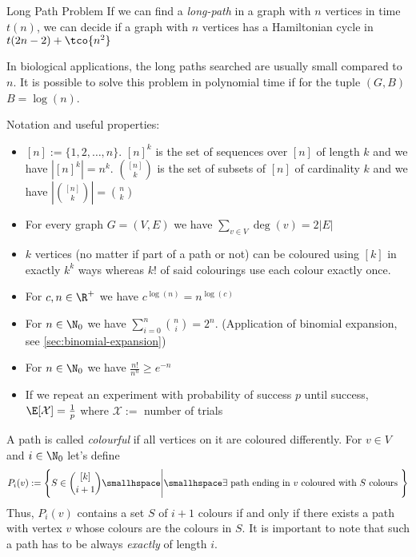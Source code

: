 \begin{theorem}[]{Long Path Problem}
    If we can find a \textit{long-path} in a graph with $n$ vertices in time $t(n)$, we can decide if a graph with $n$ vertices has a Hamiltonian cycle in $t(2n - 2) + \tco{n^2}$
\end{theorem}



In biological applications, the long paths searched are usually small compared to $n$. It is possible to solve this problem in polynomial time if for the tuple $(G, B)$ $B = \log(n)$.

Notation and useful properties:
\begin{itemize}
    \item $[n] := \{1, 2, \ldots, n\}$. $[n]^k$ is the set of sequences over $[n]$ of length $k$ and we have $\left| [n]^k \right| = n^k$. ${[n] \choose k}$ is the set of subsets of $[n]$ of cardinality $k$ and we have $\left| {[n] \choose k} \right| = {n \choose k}$
    \item For every graph $G = (V, E)$ we have $\sum_{v \in V} \deg(v) = 2|E|$
    \item $k$ vertices (no matter if part of a path or not) can be coloured using $[k]$ in exactly $k^k$ ways whereas $k!$ of said colourings use each colour exactly once.
    \item For $c, n \in \R^+$ we have $c^{\log(n)} = n^{\log(c)}$
    \item For $n \in \N_0$ we have $\sum_{i = 0}^{n} {n \choose i} = 2^n$. (Application of binomial expansion, see \ref{sec:binomial-expansion})
    \item For $n \in \N_0$ we have $\frac{n!}{n^n} \geq e^{-n}$
    \item If we repeat an experiment with probability of success $p$ until success, $\E[\mathcal{X}] = \frac{1}{p}$ where $\mathcal{X} :=$ number of trials
\end{itemize}


\newpage
{}

A path is called \textit{colourful} if all vertices on it are coloured differently.
For $v \in V$ and $i \in \N_0$ let's define
\begin{align*}
    P_i(v) := \left\{ S \in {[k] \choose i + 1} \smallhspace \Bigg| \smallhspace \exists \text{ path ending in $v$ coloured with $S$ colours } \right\}
\end{align*}
Thus, $P_i(v)$ contains a set $S$ of $i + 1$ colours if and only if there exists a path with vertex $v$ whose colours are the colours in $S$.
It is important to note that such a path has to be always \textit{exactly} of length $i$.

